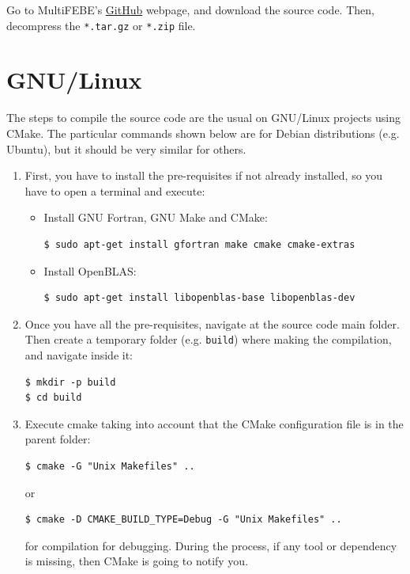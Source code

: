 \documentclass[a4paper,fleqn]{book}
\begin{document}
\label{ap:compilation}

Go to MultiFEBE's \href{https://github.com/mmc-siani-es/MultiFEBE}{GitHub} webpage, and download the source code. Then, decompress the \texttt{*.tar.gz} or \texttt{*.zip} file.

\section{GNU/Linux}

The steps to compile the source code are the usual on GNU/Linux projects using CMake. The particular commands shown below are for Debian distributions (e.g. Ubuntu), but it should be very similar for others. 
\begin{enumerate}
    \item First, you have to install the pre-requisites if not already installed, so you have to open a terminal and execute:
    \begin{itemize}
        \item Install GNU Fortran, GNU Make and CMake:
\begin{Verbatim}[frame=single, fontsize=\small]
$ sudo apt-get install gfortran make cmake cmake-extras
\end{Verbatim}
        \item Install OpenBLAS:
\begin{Verbatim}[frame=single, fontsize=\small]
$ sudo apt-get install libopenblas-base libopenblas-dev
\end{Verbatim}
    \end{itemize}
    \item Once you have all the pre-requisites, navigate at the source code main folder. Then create a temporary folder (e.g. \texttt{build}) where making the compilation, and navigate inside it:
\begin{Verbatim}[frame=single, fontsize=\small]
$ mkdir -p build
$ cd build
\end{Verbatim}
    \item Execute cmake taking into account that the CMake configuration file is in the parent folder:
\begin{Verbatim}[frame=single, fontsize=\small]
$ cmake -G "Unix Makefiles" ..
\end{Verbatim}
or
\begin{Verbatim}[frame=single, fontsize=\small]
$ cmake -D CMAKE_BUILD_TYPE=Debug -G "Unix Makefiles" ..
\end{Verbatim}
for compilation for debugging.
    During the process, if any tool or dependency is missing, then CMake is going to notify you.

\end{enumerate}
\end{document}
